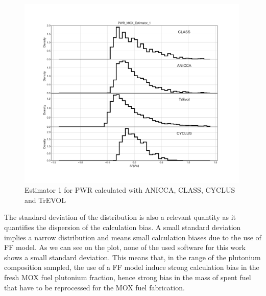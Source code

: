 
\begin{figure}[h]
	\begin{center}
		\includegraphics[width = 0.99\textwidth]{../../Feature_1/RAW_DATA/FIG/PWR_MOX_Estimator_1.pdf}
		\caption{Estimator 1 for PWR calculated with ANICCA, CLASS, CYCLUS and TrEVOL}
		\label{fig:Est1_PWR}
	\end{center}
\end{figure}

The standard deviation of the distribution is also a relevant quantity as it quantifies the dispersion of the calculation bias. A small standard deviation implies a narrow distribution and means small calculation biases due to the use of FF model. As we can see on the plot, none of the used software for this work shows a small standard deviation. This means that, in the range of the plutonium composition sampled, the use of a FF model induce strong calculation bias in the fresh MOX fuel plutonium fraction, hence strong bias in the mass of spent fuel that have to be reprocessed for the MOX fuel fabrication.

